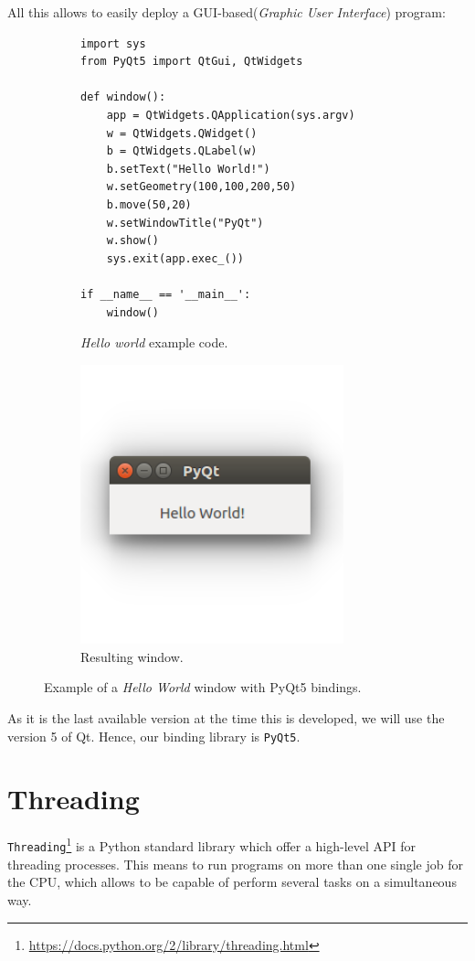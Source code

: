 	All this allows to easily deploy a GUI-based(\emph{Graphic User Interface}) program:
	\begin{figure}[h]
		\centering
		\begin{subfigure}[h]{0.55\linewidth}
			\centering
			\begin{lstlisting}
import sys
from PyQt5 import QtGui, QtWidgets

def window():
	app = QtWidgets.QApplication(sys.argv)
	w = QtWidgets.QWidget()
	b = QtWidgets.QLabel(w)
	b.setText("Hello World!")
	w.setGeometry(100,100,200,50)
	b.move(50,20)
	w.setWindowTitle("PyQt")
	w.show()
	sys.exit(app.exec_())

if __name__ == '__main__':
	window()
			\end{lstlisting}
			\caption{\emph{Hello world} example code.}
		\end{subfigure}
		\qquad
		\begin{subfigure}[h]{0.35\linewidth}
			\centering
			\includegraphics[width=3in]{images/pyqt_helloworld}
			\caption{Resulting window.}
		\end{subfigure}
		\caption{Example of a \emph{Hello World} window with PyQt5 bindings.}
		\label{fig:3_pyqt_helloworld}
	\end{figure}
	
	As it is the last available version at the time this is developed, we will use the version 5 of Qt. Hence, our binding library is \texttt{PyQt5}.\\
	
\section{Threading}
	\label{sec:3_threading}
	\texttt{Threading}\footnote{\url{https://docs.python.org/2/library/threading.html}} is a Python standard library which offer a high-level API for threading processes. This means to run programs on more than one single job for the CPU, which allows to be capable of perform several tasks on a simultaneous way.\\
	
